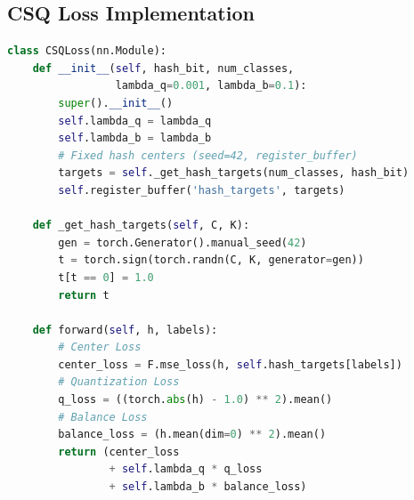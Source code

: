 \documentclass[13pt,a4paper]{article}
\begin{document}
\subsection{CSQ Loss Implementation}

\begin{lstlisting}[language=Python, caption={CSQLoss class}]
class CSQLoss(nn.Module):
    def __init__(self, hash_bit, num_classes, 
                 lambda_q=0.001, lambda_b=0.1):
        super().__init__()
        self.lambda_q = lambda_q
        self.lambda_b = lambda_b
        # Fixed hash centers (seed=42, register_buffer)
        targets = self._get_hash_targets(num_classes, hash_bit)
        self.register_buffer('hash_targets', targets)

    def _get_hash_targets(self, C, K):
        gen = torch.Generator().manual_seed(42)
        t = torch.sign(torch.randn(C, K, generator=gen))
        t[t == 0] = 1.0
        return t

    def forward(self, h, labels):
        # Center Loss
        center_loss = F.mse_loss(h, self.hash_targets[labels])
        # Quantization Loss
        q_loss = ((torch.abs(h) - 1.0) ** 2).mean()
        # Balance Loss
        balance_loss = (h.mean(dim=0) ** 2).mean()
        return (center_loss 
                + self.lambda_q * q_loss 
                + self.lambda_b * balance_loss)
\end{lstlisting}
\end{document}
